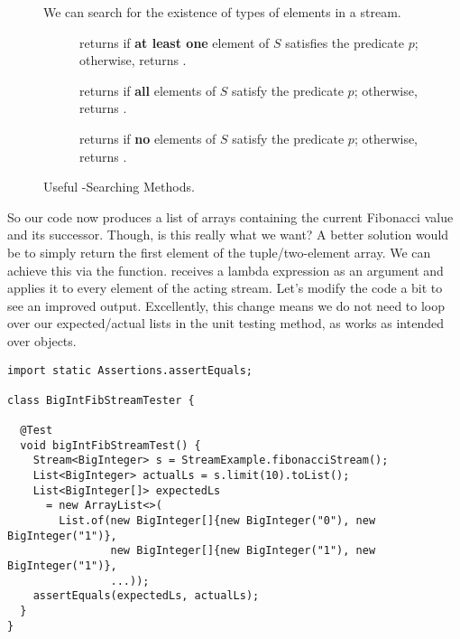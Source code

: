 \begin{figure}[tp]
  \small
  \begin{tcolorbox}[title=Java Stream--Searching Methods]
    We can search for the existence of types of elements in a stream.
    \vspace{2ex}
  \begin{description}
    \item [] returns  if \textbf{at least one} element of $S$ satisfies the predicate $p$; otherwise, returns .
    \item [] returns  if \textbf{all} elements of $S$ satisfy the predicate $p$; otherwise, returns .
    \item [] returns  if \textbf{no} elements of $S$ satisfy the predicate $p$; otherwise, returns .
  \end{description}
\end{tcolorbox}
  \caption{Useful -Searching Methods.}
  \label{fig:streams-searching}
\end{figure}

So our code now produces a list of  arrays containing the current Fibonacci value and its successor. Though, is this really what we want? A better solution would be to simply return the first element of the tuple/two-element array. We can achieve this via the  function.  receives a lambda expression as an argument and applies it to every element of the acting stream. Let's modify the code a bit to see an improved output. Excellently, this change means we do not need to loop over our expected/actual lists in the unit testing method, as  works as intended over  objects.

\begin{cl}[]{}
\begin{lstlisting}[language=MyJava]
import static Assertions.assertEquals;

class BigIntFibStreamTester {

  @Test
  void bigIntFibStreamTest() {
    Stream<BigInteger> s = StreamExample.fibonacciStream();
    List<BigInteger> actualLs = s.limit(10).toList();
    List<BigInteger[]> expectedLs 
      = new ArrayList<>(
        List.of(new BigInteger[]{new BigInteger("0"), new BigInteger("1")},
                new BigInteger[]{new BigInteger("1"), new BigInteger("1")},
                ...));
    assertEquals(expectedLs, actualLs);
  }
}
\end{lstlisting}
\end{cl}


